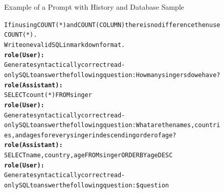 \begin{figure}[H]
\begin{AIbox}{Example of a Prompt with History and Database Sample}
{\begin{alltt}
            If in using  COUNT(*) and COUNT(COLUMN) there is no difference then use COUNT(*). \\
            Write one valid SQL in markdown format.
            \\
            {\bf role(User):} \\
            Generate syntactically correct read-only SQL to answer the following question: How many singers do we have?
            \\
            {\bf role(Assistant):} \\
            SELECT count(*) FROM singer
            \\
            {\bf role(User):} \\
            Generate syntactically correct read-only SQL to answer the following question: What are the names, countries, and ages for every singer in descending order of age?
            \\
            {\bf role(Assistant):} \\
            SELECT name ,  country ,  age FROM singer ORDER BY age DESC
            \\
            {\bf role(User):} \\
            Generate syntactically correct read-only SQL to answer the following question: \$question
        \end{alltt}
        }
        \vspace{-5px}
    \end{AIbox}
\end{figure}